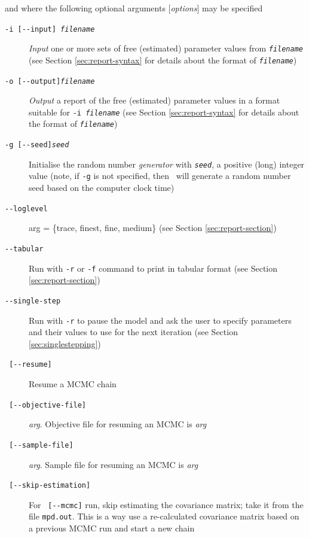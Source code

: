 and where the following optional arguments [\emph{options}] may be specified

\begin{description}
\item [\texttt{-i [-{}-input] \emph{filename}}] \emph{Input} one or more sets of free (estimated) parameter values from \texttt{\emph{filename}} (see Section \ref{sec:report-syntax} for details about the format of \texttt{\emph{filename}})

\item [\texttt{-o [-{}-output]\emph{filename}}] \emph{Output} a report of the free (estimated) parameter values in a format suitable for \texttt{-i \emph{filename}} (see Section \ref{sec:report-syntax} for details about the format of \texttt{\emph{filename}})

\item [\texttt{-g [-{}-seed]\emph{seed}}] Initialise the random number \emph{generator} with \texttt{\emph{seed}}, a positive (long) integer value (note, if \texttt{-g} is not specified, then \CNAME~will  generate a random number seed based on the computer clock time)

\item [\texttt{-{}-loglevel}] arg = \{trace, finest, fine, medium\} (see Section \ref{sec:report-section})

\item [\texttt{-{}-tabular}] Run with \texttt{-r} or \texttt{-f}  command to print  in tabular format (see Section \ref{sec:report-section})

\item [\texttt{-{}-single-step}] Run with \texttt{-r} to pause the model and ask the user to specify parameters and their values to use for the next iteration (see Section \ref{sec:singlestepping})

\item [\texttt{   [-{}-resume] }] Resume a MCMC chain

\item [\texttt{   [-{}-objective-file] }] \emph{arg}. Objective file for resuming an MCMC is \emph{arg}

\item [\texttt{   [-{}-sample-file] }] \emph{arg}. Sample file for resuming an MCMC is \emph{arg}

 
\item [\texttt{   [-{}-skip-estimation] }] For \texttt{   [-{}-mcmc]} run, skip estimating the covariance matrix; take it from the file \texttt{mpd.out}. This is a way use a re-calculated covariance matrix based on a previous MCMC run and start a new chain


\end{description}
